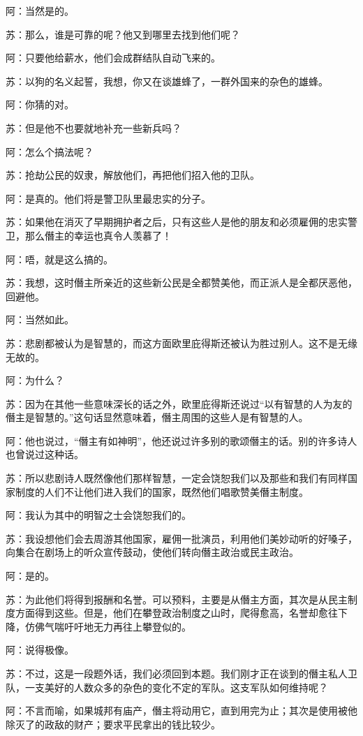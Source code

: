 \documentclass[12pt,oneside]{book}
\begin{document}
阿：当然是的。

苏：那么，谁是可靠的呢？他又到哪里去找到他们呢？

阿：只要他给薪水，他们会成群结队自动飞来的。

苏：以狗的名义起誓，我想，你又在谈雄蜂了，一群外国来的杂色的雄蜂。

阿：你猜的对。

苏：但是他不也要就地补充一些新兵吗？

阿：怎么个搞法呢？

苏：抢劫公民的奴隶，解放他们，再把他们招入他的卫队。

阿：是真的。他们将是警卫队里最忠实的分子。

苏：如果他在消灭了早期拥护者之后，只有这些人是他的朋友和必须雇佣的忠实警卫，那么僭主的幸运也真令人羡慕了！

阿：唔，就是这么搞的。

苏：我想，这时僭主所亲近的这些新公民是全都赞美他，而正派人是全都厌恶他，回避他。

阿：当然如此。

苏：悲剧都被认为是智慧的，而这方面欧里庇得斯还被认为胜过别人。这不是无缘无故的。

阿：为什么？

苏：因为在其他一些意味深长的话之外，欧里庇得斯还说过“以有智慧的人为友的僭主是智慧的。”这句话显然意味着，僭主周围的这些人是有智慧的人。

阿：他也说过，“僭主有如神明”，他还说过许多别的歌颂僭主的话。别的许多诗人也曾说过这种话。

苏：所以悲剧诗人既然像他们那样智慧，一定会饶恕我们以及那些和我们有同样国家制度的人们不让他们进入我们的国家，既然他们唱歌赞美僭主制度。

阿：我认为其中的明智之士会饶恕我们的。

苏：我设想他们会去周游其他国家，雇佣一批演员，利用他们美妙动听的好嗓子，向集合在剧场上的听众宣传鼓动，使他们转向僭主政治或民主政治。

阿：是的。

苏：为此他们将得到报酬和名誉。可以预料，主要是从僭主方面，其次是从民主制度方面得到这些。但是，他们在攀登政治制度之山时，爬得愈高，名誉却愈往下降，仿佛气喘吁吁地无力再往上攀登似的。

阿：说得极像。

苏：不过，这是一段题外话，我们必须回到本题。我们刚才正在谈到的僭主私人卫队，一支美好的人数众多的杂色的变化不定的军队。这支军队如何维持呢？

阿：不言而喻，如果城邦有庙产，僭主将动用它，直到用完为止；其次是使用被他除灭了的政敌的财产；要求平民拿出的钱比较少。
\end{document}
